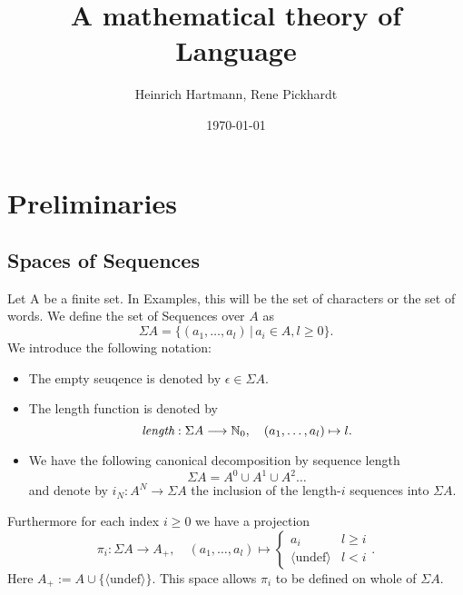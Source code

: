 \documentclass[11pt]{article}
\author{Heinrich Hartmann, Rene Pickhardt}
\date{\today}
\title{A mathematical theory of Language}
\begin{document}
\maketitle
\tableofcontents


\newcommand{\DEF}[1]{{\it #1}} %
\newcommand{\EQUIV}{\Leftrightarrow} %

\newcommand{\IN}{{\mathbb N}}
\newcommand{\IR}{{\mathbb R}}
\newcommand{\ra}{\rightarrow}
\newcommand{\lra}{\longrightarrow}
\newcommand{\union}{\cup}
\newcommand{\isect}{\cap}
 
\section{Preliminaries}
\subsection{Spaces of Sequences}
\label{sec-1-1}

\newcommand{\SEQ}{\Sigma}
\newcommand{\len}{\text{\it length}}

Let A be a finite set. In Examples, this will be the set of characters
or the set of words. We define the set of Sequences over $A$ as 
\[ \SEQ A = \{ (a_1,\dots,a_l) \,|\, a_i \in A, l \geq 0 \}. \] 
We introduce the following notation:
\begin{itemize}
\item The empty seuqence is denoted by $\epsilon \in \SEQ A$.
\item The length function is denoted by
  \[ \len: \SEQ A \lra \IN_0,\quad (a_1,\dots,a_l) \mapsto l. \]
\item We have the following canonical decomposition by sequence length
\[ \SEQ A = A^0 \union A^1 \union A^2 \dots \]
and denote by $i_N: A^N \ra \SEQ A$ the inclusion of the length-$i$ sequences into $\SEQ A$.

\end{itemize}

\newcommand{\pr}[1]{{\pi_{#1}}}
\newcommand{\PR}[2]{{\pi_{#1}^{#2}}}
\newcommand{\undef}{\langle \mathrm{undef} \rangle}

Furthermore for each index $i \geq 0$ we have a projection
\[ \pr{i}: \SEQ A \lra A_+, \quad (a_1, \dots, a_l) \mapsto 
\begin{cases}
  a_i & l \geq i  \\
  \undef & l < i
\end{cases}
. \]
Here $A_+ := A \union \{ \undef \}$. This space allows
$\pr{i}$ to be defined on whole of $\SEQ A$.
\end{document}
